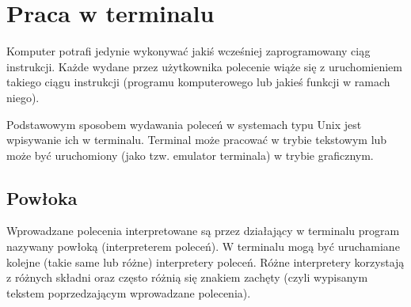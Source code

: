 % 
% 
% 
% 

\section{Praca w terminalu}

Komputer potrafi jedynie wykonywać jakiś wcześniej zaprogramowany ciąg instrukcji.
Każde wydane przez użytkownika polecenie wiąże się z uruchomieniem takiego ciągu instrukcji (programu komputerowego lub jakieś funkcji w ramach niego).

Podstawowym sposobem wydawania poleceń w systemach typu Unix jest wpisywanie ich w terminalu.
Terminal może pracować w trybie tekstowym lub może być uruchomiony (jako tzw. emulator terminala) w trybie graficznym.

\subsection{Powłoka}

Wprowadzane polecenia interpretowane są przez działający w terminalu program nazywany powłoką (interpreterem poleceń).
W terminalu mogą być uruchamiane kolejne (takie same lub różne) interpretery poleceń.
Różne interpretery korzystają z różnych składni oraz często różnią się znakiem zachęty (czyli wypisanym tekstem poprzedzającym wprowadzane polecenia).

